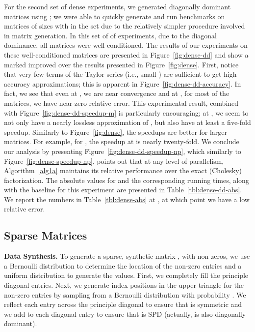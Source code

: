 For the second set of dense experiments, we generated diagonally dominant
matrices using ; we were able to quickly generate and
run benchmarks on matrices of sizes  with  in the set  due to the
relatively simpler procedure involved in matrix generation.
In this set of of experiments, due to the diagonal dominance, all matrices
were well-conditioned.
The results of our experiments on these well-conditioned matrices are
presented in Figure~\ref{fig:dense-dd} and show a marked improved over the
results presented in Figure~\ref{fig:dense}.
First, notice that very few terms of the Taylor series (i.e., small ) are
sufficient to get high accuracy approximations; this is apparent in Figure~\ref{fig:dense-dd-accuracy}.
In fact, we see that even at , we are near convergence and at , for
most of the matrices, we have near-zero relative error.
This experimental result, combined with Figure~\ref{fig:dense-dd-speedup-m} is particularly encouraging; at , we seem to not only have a nearly lossless approximation of , but also have at least a five-fold speedup.
Similarly to Figure~\ref{fig:dense}, the speedups are better for larger matrices.
For example, for , the speedup at  is nearly twenty-fold.
We conclude our analysis by presenting Figure~\ref{fig:dense-dd-speedup-np},
which similarly to Figure~\ref{fig:dense-speedup-np}, points out that at any
level of parallelism, Algorithm~\ref{alg1a} maintains its relative performance
over the exact (Cholesky) factorization.
The absolute values for  and the corresponding running times, along with the baseline
for this experiment are presented in Table~\ref{tbl:dense-dd-abs}.
We report the numbers in Table~\ref{tbl:dense-abs} at , at which point we
have a low relative error.


\subsection{Sparse Matrices}

\label{subsec:sparse_matrices}
\vspace{0.02in}\noindent \textbf{Data Synthesis.}
To generate a sparse, synthetic matrix , with
 non-zeros, we use a Bernoulli distribution to determine the location of
the non-zero entries and a uniform distribution to generate the values.
First, we completely fill the  principle diagonal entries.
Next, we generate  index positions in the upper triangle for
the non-zero entries by sampling from a Bernoulli distribution with
probability .
We reflect each entry across the principle diagonal to ensure that  is symmetric and we add  to each diagonal entry to ensure that  is SPD (actually,  is also diagonally dominant).

